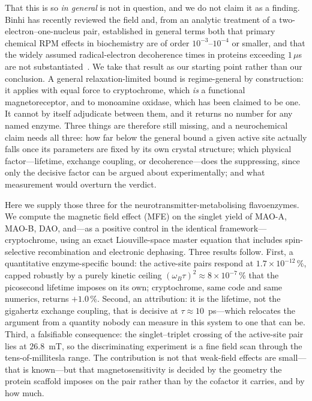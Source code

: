 \documentclass[twoside,twocolumn,9pt]{article}
\begin{document}
That this is so \emph{in general} is not in question, and we do not claim it as a
finding. Binhi has recently reviewed the field and, from an analytic treatment of
a two-electron--one-nucleus pair, established in general terms both that primary
chemical RPM effects in biochemistry are of order $10^{-3}$--$10^{-4}$ or
smaller, and that the widely assumed radical-electron decoherence times in
proteins exceeding $1\,\mu$s are not substantiated~\cite{Binhi2025}. We take that
result as our starting point rather than our conclusion. A general
relaxation-limited bound is regime-general by construction: it applies with equal
force to cryptochrome, which \emph{is} a functional magnetoreceptor, and to
monoamine oxidase, which has been claimed to be one. It cannot by itself
adjudicate between them, and it returns no number for any named enzyme. Three
things are therefore still missing, and a neurochemical claim needs all three:
how far below the general bound a given active site actually falls once its
parameters are fixed by its own crystal structure; which physical
factor---lifetime, exchange coupling, or decoherence---does the suppressing,
since only the decisive factor can be argued about experimentally; and what
measurement would overturn the verdict.

Here we supply those three for the neurotransmitter-metabolising flavoenzymes. We
compute the magnetic field effect (MFE) on the singlet yield of MAO-A, MAO-B, DAO,
and---as a positive control in the identical framework---cryptochrome, using an
exact Liouville-space master equation that includes spin-selective recombination
and electronic dephasing. Three results follow. First, a quantitative
enzyme-specific bound: the active-site pairs respond at $1.7\times10^{-12}\,\%$,
capped robustly by a purely kinetic ceiling $(\omega_B\tau)^2\approx
8\times10^{-7}\,\%$ that the picosecond lifetime imposes on its own; cryptochrome,
same code and same numerics, returns $+1.0\,\%$. Second, an attribution: it is
the lifetime, not the gigahertz exchange coupling, that is decisive at
$\tau\approx10$~ps---which relocates the argument from a quantity nobody can
measure in this system to one that can be. Third, a falsifiable consequence: the
singlet--triplet crossing of the active-site pair lies at $26.8$~mT, so the
discriminating experiment is a fine field scan through the tens-of-millitesla
range. The contribution is not that weak-field effects are small---that is
known---but that magnetosensitivity is decided by the geometry the protein
scaffold imposes on the pair rather than by the cofactor it carries, and by how
much.
\end{document}
